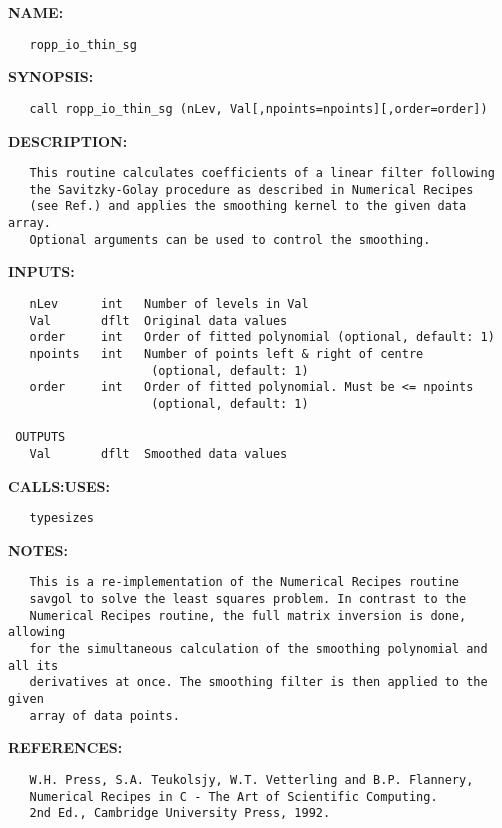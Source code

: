 \label{ch:robo110}
\label{ch:Thin_ropp_io_thin_sg}
\textbf{NAME:}\hspace{0.08in}\begin{Verbatim}
   ropp_io_thin_sg
\end{Verbatim}
\textbf{SYNOPSIS:}\hspace{0.08in}\begin{Verbatim}
   call ropp_io_thin_sg (nLev, Val[,npoints=npoints][,order=order])
\end{Verbatim}
\textbf{DESCRIPTION:}\hspace{0.08in}\begin{Verbatim}
   This routine calculates coefficients of a linear filter following
   the Savitzky-Golay procedure as described in Numerical Recipes
   (see Ref.) and applies the smoothing kernel to the given data array.
   Optional arguments can be used to control the smoothing.
\end{Verbatim}
\textbf{INPUTS:}\hspace{0.08in}\begin{Verbatim}
   nLev      int   Number of levels in Val
   Val       dflt  Original data values
   order     int   Order of fitted polynomial (optional, default: 1)
   npoints   int   Number of points left & right of centre
                    (optional, default: 1)
   order     int   Order of fitted polynomial. Must be <= npoints
                    (optional, default: 1)

 OUTPUTS
   Val       dflt  Smoothed data values
\end{Verbatim}
\textbf{CALLS:}\hspace{0.08in}\textbf{USES:}\hspace{0.08in}\begin{Verbatim}
   typesizes
\end{Verbatim}
\textbf{NOTES:}\hspace{0.08in}\begin{Verbatim}
   This is a re-implementation of the Numerical Recipes routine
   savgol to solve the least squares problem. In contrast to the 
   Numerical Recipes routine, the full matrix inversion is done, allowing 
   for the simultaneous calculation of the smoothing polynomial and all its 
   derivatives at once. The smoothing filter is then applied to the given 
   array of data points.
\end{Verbatim}
\textbf{REFERENCES:}\hspace{0.08in}\begin{Verbatim}
   W.H. Press, S.A. Teukolsjy, W.T. Vetterling and B.P. Flannery,
   Numerical Recipes in C - The Art of Scientific Computing.
   2nd Ed., Cambridge University Press, 1992.
\end{Verbatim}
